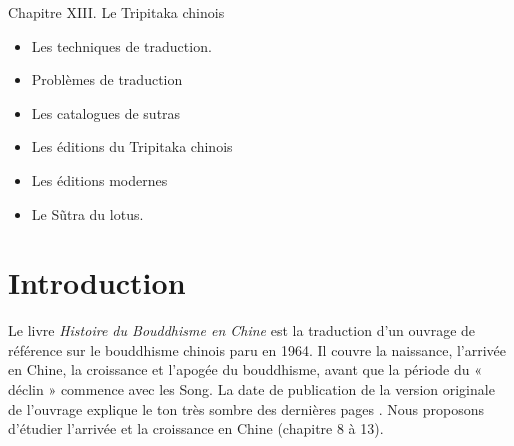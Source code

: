 Chapitre XIII. Le Tripitaka chinois

    \begin{itemize}
        \item Les techniques de traduction.
        \item Problèmes de traduction
        \item Les catalogues de sutras
        \item Les éditions du Tripitaka chinois
        \item Les éditions modernes
        \item Le Sũtra du lotus.
    \end{itemize}



\section{Introduction}

Le livre \textit{Histoire du Bouddhisme en Chine} \cite{chen_histoire_2015} est la traduction d’un ouvrage de référence sur le bouddhisme chinois paru en 1964. Il couvre  la naissance, l’arrivée en Chine, la croissance et l’apogée du bouddhisme, avant que la période du « déclin » commence avec les Song. 
La date de publication de la version originale de l’ouvrage explique le ton très sombre des dernières pages \cite{vermander_kenneth_2016}.
Nous proposons d'étudier l'arrivée et la croissance en Chine (chapitre 8 à 13).






